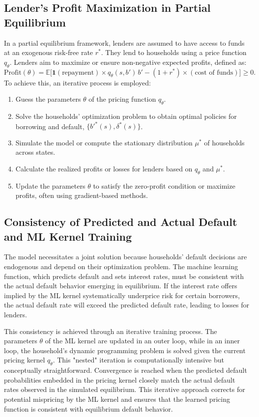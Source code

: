 \documentclass[acmsmall]{acmart}
\begin{document}
\subsection*{Lender’s Profit Maximization in Partial Equilibrium}

In a partial equilibrium framework, lenders are assumed to have access to funds at an exogenous risk-free rate $r^*$. They lend to households using a price function $q_\theta$. Lenders aim to maximize or ensure non-negative expected profits, defined as:
\begin{equation}
\text{Profit}(\theta) = \mathbb{E}\bigl[
   \mathbf{1}(\text{repayment}) \times q_\theta(s,b')\,b'
   - (1+r^*)\times(\text{cost of funds})
\bigr] \ge 0.
\end{equation}
To achieve this, an iterative process is employed:
\begin{enumerate}
    \item Guess the parameters $\theta$ of the pricing function $q_\theta$.
    \item Solve the households’ optimization problem to obtain optimal policies for borrowing and default, $\{b'^*(s), \delta^*(s)\}$.
    \item Simulate the model or compute the stationary distribution $\mu^*$ of households across states.
    \item Calculate the realized profits or losses for lenders based on $q_\theta$ and $\mu^*$.
    \item Update the parameters $\theta$ to satisfy the zero-profit condition or maximize profits, often using gradient-based methods.
\end{enumerate}

\subsection*{Consistency of Predicted and Actual Default and ML Kernel Training}

The model necessitates a joint solution because households' default decisions are endogenous and depend on their optimization problem. The machine learning function, which predicts default and sets interest rates, must be consistent with the actual default behavior emerging in equilibrium.  If the interest rate offers implied by the ML kernel systematically underprice risk for certain borrowers, the actual default rate will exceed the predicted default rate, leading to losses for lenders.

This consistency is achieved through an iterative training process. The parameters $\theta$ of the ML kernel are updated in an outer loop, while in an inner loop, the household's dynamic programming problem is solved given the current pricing kernel $q_{\theta}$. This "nested" iteration is computationally intensive but conceptually straightforward. Convergence is reached when the predicted default probabilities embedded in the pricing kernel closely match the actual default rates observed in the simulated equilibrium. This iterative approach corrects for potential mispricing by the ML kernel and ensures that the learned pricing function is consistent with equilibrium default behavior.
\end{document}
